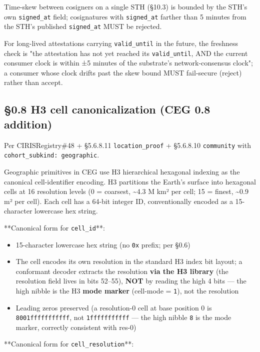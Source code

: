 \documentclass[10pt]{article}
\begin{document}
Time-skew between cosigners on a single STH (§10.3) is bounded by the STH's own \texttt{signed\_at} field; cosignatures with \texttt{signed\_at} farther than 5 minutes from the STH's published \texttt{signed\_at} MUST be rejected.


For long-lived attestations carrying \texttt{valid\_until} in the future, the freshness check is "the attestation has not yet reached its \texttt{valid\_until}, AND the current consumer clock is within ±5 minutes of the substrate's network-consensus clock"; a consumer whose clock drifts past the skew bound MUST fail-secure (reject) rather than accept.



\subsection*{§0.8 H3 cell canonicalization (CEG 0.8 addition)}


Per CIRISRegistry\#48 + §5.6.8.11 \texttt{location\_proof} + §5.6.8.10 \texttt{community} with \texttt{cohort\_subkind: geographic}.


Geographic primitives in CEG use H3 hierarchical hexagonal indexing as the canonical cell-identifier encoding. H3 partitions the Earth's surface into hexagonal cells at 16 resolution levels (0 = coarsest, \textasciitilde{}4.3 M km² per cell; 15 = finest, \textasciitilde{}0.9 m² per cell). Each cell has a 64-bit integer ID, conventionally encoded as a 15-character lowercase hex string.


**Canonical form for \texttt{cell\_id}**:


\begin{itemize}\setlength\itemsep{0pt}
\item 15-character lowercase hex string (no \texttt{0x} prefix; per §0.6)
\item The cell encodes its own resolution in the standard H3 index bit layout; a conformant decoder extracts the resolution \textbf{via the H3 library} (the resolution field lives in bits 52–55), \textbf{NOT} by reading the high 4 bits — the high nibble is the H3 \textbf{mode marker} (cell-mode = \texttt{1}), not the resolution
\item Leading zeros preserved (a resolution-0 cell at base position 0 is \texttt{8001fffffffffff}, not \texttt{1fffffffffff} — the high nibble \texttt{8} is the mode marker, correctly consistent with res-0)
\end{itemize}


**Canonical form for \texttt{cell\_resolution}**:
\end{document}
